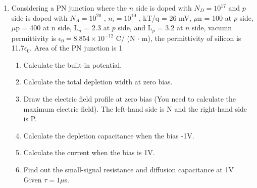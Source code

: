 \begin{enumerate}
    \item Considering a PN junction where the $n$ side is doped with $N_D = 10^{17}$ \conc and $p$ side is doped with $N_A = 10^{20}$ \conc, $n_i = 10^{10}$ \conc, kT/q = 26 mV, $\mu$n = 100 \mobility at $p$ side, $\mu$p = 400 \mobility at n side, L$_n$ = 2.3 \mun at $p$ side, and L$_p$ = 3.2 \mun at $n$ side, vacumn permittivity is $\epsilon_0 = 8.854 \times 10^{-12}$ C\sq/ (N $\cdot$ m\sq), the permittivity of silicon is 11.7$\epsilon_0$. Area of the PN junction is 1 \mun\sq
    \begin{enumerate}
        \item Calculate the built-in potential.
        \item Calculate the total depletion width at zero bias.
        \item Draw the electric field profile at zero bias (You need to calculate the maximum electric field). The left-hand side is N and the right-hand side is P.
        \item Calculate the depletion capacitance when the bias -1V. 
        \item Calculate the current when the bias is 1V.
        \item Find out the small-signal resistance and diffusion capacitance at 1V Given $\tau = 1 \mu$s. 
    \end{enumerate}
\end{enumerate}